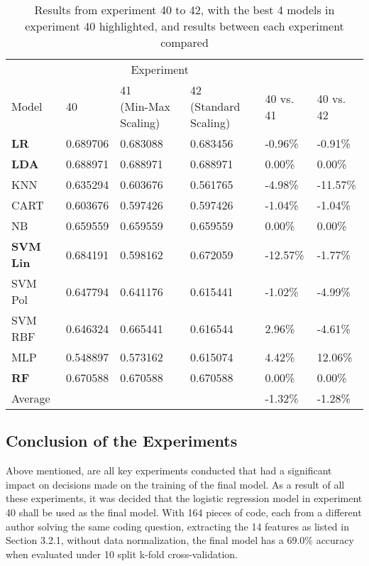 \documentclass{report}
\begin{document}
\begin{table}[h!]
\centering
\begin{tabular}{l|lll|ll}
\hline
& \multicolumn{3}{c|}{Experiment} & & \\
Model & 40 & \makecell{41 \\ (Min-Max Scaling)} & \makecell{42 \\ (Standard Scaling)} & 40 vs. 41 & 40 vs. 42 \\
\hline
\textbf{LR} & 0.689706 & 0.683088 & 0.683456 & -0.96\% & -0.91\% \\
\textbf{LDA} & 0.688971 & 0.688971 & 0.688971 & 0.00\% & 0.00\% \\
KNN & 0.635294 & 0.603676 & 0.561765 & -4.98\% & -11.57\% \\
CART & 0.603676 & 0.597426 & 0.597426 & -1.04\% & -1.04\% \\
NB & 0.659559 & 0.659559 & 0.659559 & 0.00\% & 0.00\% \\
\textbf{SVM Lin} & 0.684191 & 0.598162 & 0.672059 & -12.57\% & -1.77\% \\
SVM Pol & 0.647794 & 0.641176 & 0.615441 & -1.02\% & -4.99\% \\
SVM RBF & 0.646324 & 0.665441 & 0.616544 & 2.96\% & -4.61\% \\
MLP & 0.548897 & 0.573162 & 0.615074 & 4.42\% & 12.06\% \\
\textbf{RF} & 0.670588 & 0.670588 & 0.670588 & 0.00\% & 0.00\% \\
\hline
Average & & & & -1.32\% & -1.28\% \\
\hline
\end{tabular}
\caption{Results from experiment 40 to 42, with the best 4 models in experiment 40 highlighted, and results between each experiment compared}
\label{tab:3.8}
\end{table}

\subsection{Conclusion of the Experiments}

Above mentioned, are all key experiments conducted that had a significant impact on decisions made on the training of the final model. As a result of all these experiments, it was decided that the logistic regression model in experiment 40 shall be used as the final model. With 164 pieces of code, each from a different author solving the same coding question, extracting the 14 features as listed in Section 3.2.1, without data normalization, the final model has a 69.0\% accuracy when evaluated under 10 split k-fold cross-validation.
\end{document}
